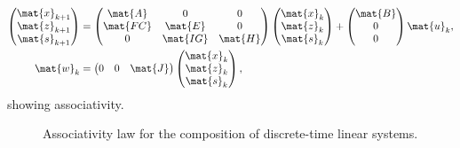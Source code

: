\begin{equation*}
    \label{eq:dlin-7}
    \begin{aligned}
        \begin{pmatrix}
            \mat{x}_{k+1} \\
            \mat{z}_{k+1} \\
            \mat{s}_{k+1}
        \end{pmatrix} & =
        \begin{pmatrix}
            \mat{A}  & 0        & 0       \\
            \mat{FC} & \mat{E}  & 0       \\
            0        & \mat{IG} & \mat{H}
        \end{pmatrix}\begin{pmatrix}
                         \mat{x}_k \\ \mat{z}_k\\ \mat{s}_k
                     \end{pmatrix}+
        \begin{pmatrix}
            \mat{B} \\ 0\\ 0
        \end{pmatrix}\mat{u}_k,                                                             \\
        \mat{w}_k                         & =\begin{pmatrix}
                                                 0 & 0 & \mat{J}
                                             \end{pmatrix}\begin{pmatrix}
                                                              \mat{x}_k \\ \mat{z}_k\\ \mat{s}_k
                                                          \end{pmatrix},
    \end{aligned}
\end{equation*}
showing associativity.

\begin{figure}[tbh]
    \centering
    \prflinepadbefore=5pt
    \prflinepadafter=5pt
    {
    }
    \caption{Associativity law for the composition of discrete-time linear systems. }
    \label{fig:ass_dyn_syst}
\end{figure}

